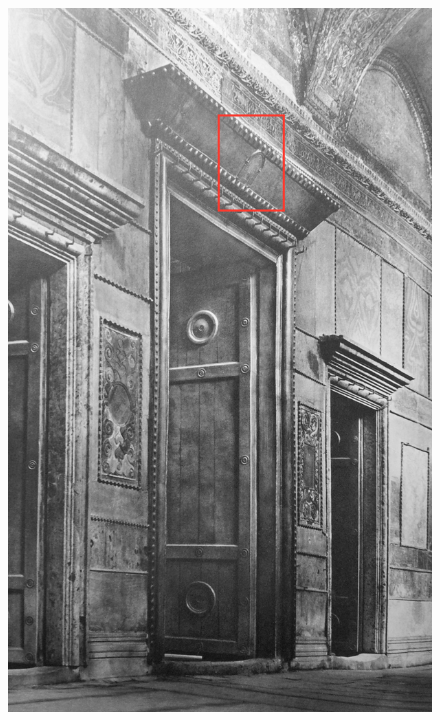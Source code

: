 \documentclass[amsthm,ebook]{saparticle}
\begin{document}
\begin{figure}[!hbp]
\centering
\begin{minipage}[c]{0.42\textwidth}
 \includegraphics[width=\columnwidth]{FelleVisualFeaturesofinscriptionsEAGLE2016FullPaper-img012.jpg}
\end{minipage}
\begin{minipage}[c]{0.57\textwidth}

\end{minipage}
\end{figure}
\end{document}
